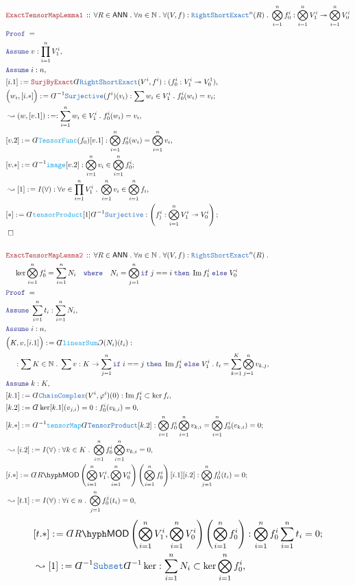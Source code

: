 \documentclass[12pt]{scrartcl}%
\newcommand{\TYPE}[1]{\textcolor{NavyBlue}{\mathtt{#1}}}%
\newcommand{\FUNC}[1]{\textcolor{Cerulean}{\mathtt{#1}}}%
\newcommand{\LOGIC}[1]{\textcolor{Blue}{\mathtt{#1}}}%
\newcommand{\THM}[1]{\textcolor{Maroon}{\mathtt{#1}}}%
\renewcommand{\.}{\; . \;} %
\newcommand{\de}{: \kern 0.1pc =} %
\newcommand{\where}{\LOGIC{where}} %
\newcommand{\If}{\LOGIC{if} \;} %
\newcommand{\Then}{ \; \LOGIC{then} \;} %
\newcommand{\Else}{\; \LOGIC{else} \;} %
\newcommand{\Theorem}[2]{& \THM{#1} \, :: \, #2 \\ & \Proof = \\ } %
\newcommand{\NewLine}{\\ & \kern 1pc}%
\newcommand{\Page}[1]{ \begin{align*} #1 \end{align*}  }%
\newcommand{ \bd }{ \ByDef }%
\newcommand{\Nat}{\mathbb{N}}%
\DeclareMathOperator*{\im}{Im}%
\newcommand{\ToSurj}{\twoheadrightarrow} %
\newcommand{\Say}[3]{& #1 \de #2 : #3, \\} %
\newcommand{\Conclude}[3]{& #1 \de #2 : #3; \\}%
\newcommand{\Derive}[3]{& \leadsto #1 \de #2 : #3, \\} %
\newcommand{\Assume}[2]{& \LOGIC{Assume} \; #1 : #2, \\} %
\newcommand{\QED}{\; \square} %
\newcommand{\EndProof}{& \QED \\} %
\newcommand{\ByDef}{\rotatebox[origin=c]{-180}{$D$}}%
\newcommand{\ByConstr}{\rotatebox[origin=c]{-180}{$C$}}%
\newcommand{\Proof}{\LOGIC{Proof} \; } %
\newcommand{\LMOD}[1]{#1\hyph\mathsf{MOD}} %
\newcommand{\ANN}{\mathsf{ANN}} %
\begin{document}
\Page{
	\Theorem{ExactTensorMapLemma1}{
		\forall R \in \ANN \.
		\forall n \in \Nat \. 
		\forall (V,f) : \TYPE{RightShortExact}^n(R) \.
		\bigotimes^n_{i=1} f^i_0 : \bigotimes^n_{i=1} V_1^i \ToSurj \bigotimes^n_{i=1} V_0^i
	}
	\Assume{v}{\prod^n_{i=1} V^i_1}
	\Assume{i}{n}
	\Say{[i.1]}{\THM{SurjByExact}\bd \TYPE{RightShortExact}(V^i,f^i)}{(f^i_0 : V^i_1 \ToSurj V^1_0)}
	\Conclude{\Big(w_i,[i.*]\Big)}{\bd^{-1} \TYPE{Surjective}(f^i)(v_i)}{ \sum w_i \in V^i_1 \. f^i_0(w_i) = v_i }
	\Derive{(w,[v.1])}{}{\sum^n_{i=1} w_i \in V^i_1 \. f^i_0(w_i) = v_i}
	\Say{[v.2]}{\bd \FUNC{TensorFunc}(f_0)[v.1]}{\bigotimes^n_{i=1} f_0^i(w_i) = \bigotimes^n_{i=1} v_i}
	\Conclude{[v.*]}{ \bd^{-1} \FUNC{image} [v.2] }{ \bigotimes^n_{i=1} v_i \in \bigotimes^n_{i=1} f_0^i}
	\Derive{[1]}{I(\forall)}{\forall v \in \prod^n_{i=1} V^i_1 \. \bigotimes^n_{i=1} v_i \in \bigotimes^n_{i=1} f_i  }
	\Conclude{[*]}{\bd \FUNC{tensorProduct}[1]\bd^{-1}\TYPE{Surjective}}{\left( f^i_) : \bigotimes^n_{i=1} V_1^i \ToSurj V_0^i  \right)}
	\EndProof
	\\
	\Theorem{ExactTensorMapLemma2}{
		\forall R \in \ANN \.
		\forall n \in \Nat \. 
		\forall (V,f) : \TYPE{RightShortExact}^n(R) \. \NewLine
		\ker \bigotimes^n_{i=1} f^i_0 = \sum^n_{i=1} N_i  \quad \where \quad  N_i = \bigotimes^n_{j=1} \If j == i \Then \im f_1^i \Else V_0^i 
	}
	\Assume{\sum^n_{i=1} t_i}{\sum^n_{i=1} N_i}
	\Assume{i}{n}
	\Say{\Big( K, v, [i.1]  \Big)}{\bd \FUNC{linearSum}\ByConstr(N_i)(t_i)}
	{ 
		\NewLine :
		\sum K \in \Nat \. \sum v : K \to \sum^n_{j=1} \If i == j \Then \im f^i_1 \Else V^i_1 \.  t_i = \sum^K_{k=1} \bigotimes^n_{j=1} v_{k,j}
	}
	\Assume{k}{K}
	\Say{[k.1]}{\bd \TYPE{ChainComplex}(V^i,\varphi^i)(0)}{ \im f^i_1 \subset \ker f_i}
	\Say{[k.2]}{\bd \ker [k.1](v_{j,i})=0}{f^i_0(v_{k,i})= 0}
	\Conclude{[k.*]}{\bd^{-1} \FUNC{tensorMap}\bd \TYPE{TensorProduct}[k.2]}{ \bigotimes^n_{i=1} f_0^i \bigotimes^n_{i=1} v_{k,i} = \bigotimes^n_{i=1} f_0^i(v_{k,i}) = 0}
	\Derive{[i.2]}{I(\forall)}{\forall k \in K \. \bigotimes^n_{i=1} f^i_0 \bigotimes^n_{i=1} v_{k,i} = 0}
	\Conclude{[i.*]}{ \bd \LMOD{R} \left( \bigotimes^n_{i=1} V^i_1, \bigotimes^n_{i=1} V^i_0 \right)\left(\bigotimes^n_{i=1} f^i_0 \right)[i.1][i.2]}
	{\bigotimes^n_{j=1} f^j_0(t_i) = 0}
	\Derive{[t.1]}{ I(\forall)}{\forall i \in n \. \bigotimes^n_{j=1} f^j_0(t_i) = 0}
}\Page{
	\Conclude{[t.*]}{\bd \LMOD{R} \left( \bigotimes^n_{i=1} V^i_1,\bigotimes^n_{i=1} V^i_0 \right)\left(\bigotimes^n_{i=1} f^i_0\right)}
	{  \bigotimes^n_{i=1} f_0^i \sum^n_{i=1} t_i = 0  }
	\Derive{[1]}{\bd^{-1} \TYPE{Subset}\bd^{-1} \ker}{\sum^n_{i=1} N_i \subset \ker \bigotimes^n_{i=1} f_0^i}
}
\end{document}
